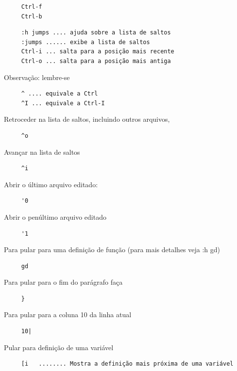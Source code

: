 \documentclass[10pt,a4paper,openany]{book}
\begin{document}
\begin{verbatim}
     Ctrl-f
     Ctrl-b
\end{verbatim}


\begin{verbatim}
     :h jumps .... ajuda sobre a lista de saltos
     :jumps ...... exibe a lista de saltos
     Ctrl-i ... salta para a posição mais recente
     Ctrl-o ... salta para a posição mais antiga
\end{verbatim}

Observação: lembre-se

\begin{verbatim}
     ^ .... equivale a Ctrl
     ^I ... equivale a Ctrl-I
\end{verbatim}


Retroceder na lista de saltos, incluindo outros arquivos,

\begin{verbatim}
     ^o
\end{verbatim}

Avançar na lista de saltos

\begin{verbatim}
     ^i
\end{verbatim}

Abrir o último arquivo editado:

\begin{verbatim}
     '0
\end{verbatim}

Abrir o penúltimo arquivo editado

\begin{verbatim}
     '1
\end{verbatim}

Para pular para uma definição de função (para mais detalhes veja :h gd)

\begin{verbatim}
     gd
\end{verbatim}

Para pular para o fim do parágrafo faça

\begin{verbatim}
     }
\end{verbatim}

Para pular para a coluna 10 da linha atual

\begin{verbatim}
     10|
\end{verbatim}

Pular para definição de uma variável

\begin{verbatim}
     [i   ........ Mostra a definição mais próxima de uma variável
\end{verbatim}
\end{document}
